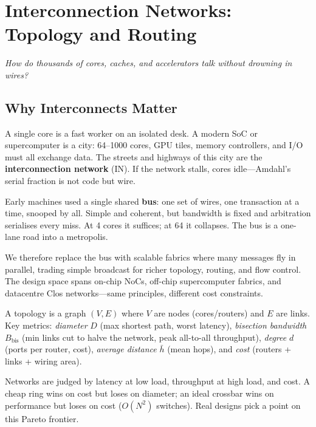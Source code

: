 \chapter{Interconnection Networks: Topology and Routing}\label{ch:interconnect}
\begin{center}\small\textit{How do thousands of cores, caches, and accelerators talk without drowning in wires?}\end{center}

\section{Why Interconnects Matter}
A single core is a fast worker on an isolated desk. A modern SoC or supercomputer is a
city: 64--1000 cores, GPU tiles, memory controllers, and I/O must all exchange data. The
streets and highways of this city are the \textbf{interconnection network} (IN). If the
network stalls, cores idle---Amdahl's serial fraction is not code but wire.

Early machines used a single shared \textbf{bus}: one set of wires, one transaction at a
time, snooped by all. Simple and coherent, but bandwidth is fixed and arbitration
serialises every miss. At 4 cores it suffices; at 64 it collapses. The bus is a one-lane
road into a metropolis.

We therefore replace the bus with scalable fabrics where many messages fly in parallel,
trading simple broadcast for richer topology, routing, and flow control. The design
space spans on-chip NoCs, off-chip supercomputer fabrics, and datacentre Clos
networks---same principles, different cost constraints.

\begin{definition}
A topology is a graph $(V,E)$ where $V$ are nodes (cores/routers) and $E$ are links. Key
metrics: \emph{diameter} $D$ (max shortest path, worst latency), \emph{bisection
bandwidth} $B_{\text{bis}}$ (min links cut to halve the network, peak all-to-all
throughput), \emph{degree} $d$ (ports per router, cost), \emph{average distance}
$\bar{h}$ (mean hops), and \emph{cost} (routers + links + wiring area).
\end{definition}
Networks are judged by latency at low load, throughput at high load, and cost. A cheap
ring wins on cost but loses on diameter; an ideal crossbar wins on performance but loses
on cost ($O(N^2)$ switches). Real designs pick a point on this Pareto frontier.

